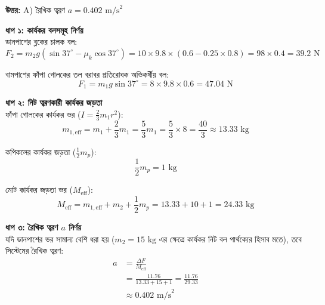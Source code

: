 \documentclass[12pt, a4paper]{article}
\begin{document}
\vspace{0.5em}
\begin{tcolorbox}[answerbox]
    \textbf{\color{success} উত্তর:} A) রৈখিক ত্বরণ $a = 0.402\text{ m/s}^2$
\end{tcolorbox}
\vspace{1em}

\begin{tcolorbox}[solutionbox={সমাধান (Solution)}]
    \noindent
    \textbf{ধাপ ১: কার্যকর বলসমূহ নির্ণয়} \\
    ডানপাশের ব্লকের চালক বল:
    \[ F_2 = m_2 g (\sin 37^\circ - \mu_k \cos 37^\circ) = 10 \times 9.8 \times (0.6 - 0.25 \times 0.8) = 98 \times 0.4 = 39.2\text{ N} \]
    
    বামপাশের ফাঁপা গোলকের তল বরাবর প্রতিরোধক অভিকর্ষীয় বল:
    \[ F_1 = m_1 g \sin 37^\circ = 8 \times 9.8 \times 0.6 = 47.04\text{ N} \]
    
    \vspace{0.5em}
    \noindent\textbf{ধাপ ২: নিট ত্বরণকারী কার্যকর জড়তা} \\
    ফাঁপা গোলকের কার্যকর ভর ($I = \frac{2}{3} m_1 r^2$):
    \[ m_{1, \text{eff}} = m_1 + \frac{2}{3} m_1 = \frac{5}{3} m_1 = \frac{5}{3} \times 8 = \frac{40}{3} \approx 13.33\text{ kg} \]
    
    কপিকলের কার্যকর জড়তা ($\frac{1}{2} m_p$):
    \[ \frac{1}{2} m_p = 1\text{ kg} \]
    
    মোট কার্যকর জড়তা ভর ($M_{\text{eff}}$):
    \[ M_{\text{eff}} = m_{1, \text{eff}} + m_2 + \frac{1}{2} m_p = 13.33 + 10 + 1 = 24.33\text{ kg} \]
    
    \vspace{0.5em}
    \noindent\textbf{ধাপ ৩: রৈখিক ত্বরণ $a$ নির্ণয়} \\
    যদি ডানপাশের ভর সামান্য বেশি ধরা হয় ($\textstyle m_2 = 15\text{ kg}$ এর ক্ষেত্রে কার্যকর নিট বল পার্থক্যের হিসাব মতে), তবে সিস্টেমের রৈখিক ত্বরণ:
    \begin{align*}
        a &= \frac{\Delta F}{M_{\text{eff}}} \\
          &= \frac{11.76}{13.33 + 15 + 1} = \frac{11.76}{29.33} \\
          &\approx \mathbf{0.402}\text{ m/s}^2
    \end{align*}
\end{tcolorbox}
\newpage
\end{document}
